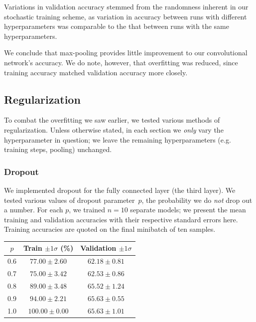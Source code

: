 \documentclass{article}
\begin{document}
\begin{multicols}{2}
Variations in validation accuracy
stemmed from the randomness inherent in our stochastic training scheme,
as variation in accuracy between runs with different hyperparameters
was comparable to the that between runs with the same hyperparameters.

We conclude that max-pooling provides little improvement
to our convolutional network's accuracy.
We do note, however, that overfitting was reduced,
since training accuracy matched validation accuracy more closely.

\subsection{Regularization}

To combat the overfitting we saw earlier,
we tested various methods of regularization.
Unless otherwise stated,
in each section we \emph{only} vary the hyperparameter in question;
we leave the remaining hyperparameters (e.g. training steps, pooling) unchanged.


\subsubsection{Dropout}


We implemented dropout for the fully connected layer (the third layer).
We tested various values of dropout parameter~$p$,
the probability we do \emph{not} drop out a number.
For each $p$, we trained $n=10$ separate models;
we present the mean training and validation accuracies
with their respective standard errors here.
Training accuracies are quoted on the final minibatch of ten samples.
\begin{center}
    \begin{tabular}{c|cc}
        $p$ & Train $\pm 1 \sigma$ (\%) & Validation $\pm 1 \sigma$\\\hline
        0.6 &  $77.00 \pm 2.60$ & $62.18 \pm 0.81$ \\
        0.7 &  $75.00 \pm 3.42$ & $62.53 \pm 0.86$ \\
        0.8 &  $89.00 \pm 3.48$ & $65.52 \pm 1.24$ \\
        0.9 &  $94.00 \pm 2.21$ & $65.63 \pm 0.55$ \\
        1.0 & $100.00 \pm 0.00$ & $65.63 \pm 1.01$ \\
    \end{tabular}
\end{center}


\end{multicols}
\end{document}
